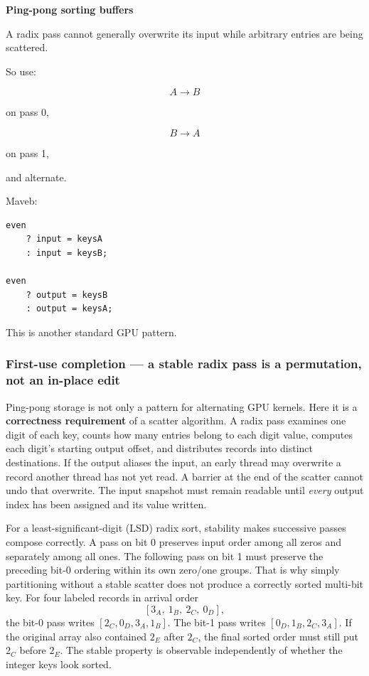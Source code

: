 \textbf{Ping-pong sorting buffers}

A radix pass cannot generally overwrite its input while arbitrary entries are being scattered.

So use:

\[
A\rightarrow B
\]

on pass 0,

\[
B\rightarrow A
\]

on pass 1,

and alternate.

Maveb:

\protect{}\label{w6g26n}%
\begin{verbatim}
even
    ? input = keysA
    : input = keysB;

even
    ? output = keysB
    : output = keysA;
\end{verbatim}

This is another standard GPU pattern.

\subsubsection{First-use completion --- a stable radix pass is a permutation, not an in-place edit}\label{03-visual-computing-i-ch016-first-use-completion-a-stable-radix-pass-is-a-permutation-not-an-in-place-edit}

\hypertarget{03-visual-computing-i-ch016-first-use-completion-a-stable-radix-pass-is-a-permutation-not-an-in-place-edit}{}

Ping-pong storage is not only a pattern for alternating GPU kernels. Here it is a \textbf{correctness requirement} of a scatter algorithm. A radix pass examines one digit of each key, counts how many entries belong to each digit value, computes each digit's starting output offset, and distributes records into distinct destinations. If the output aliases the input, an early thread may overwrite a record another thread has not yet read. A barrier at the end of the scatter cannot undo that overwrite. The input snapshot must remain readable until \emph{every} output index has been assigned and its value written.

For a least-significant-digit (LSD) radix sort, stability makes successive passes compose correctly. A pass on bit 0 preserves input order among all zeros and separately among all ones. The following pass on bit 1 must preserve the preceding bit-0 ordering within its own zero/one groups. That is why simply partitioning without a stable scatter does not produce a correctly sorted multi-bit key. For four labeled records in arrival order \[
[3_A,\ 1_B,\ 2_C,\ 0_D],
\] the bit-0 pass writes \([2_C,0_D,3_A,1_B]\). The bit-1 pass writes \([0_D,1_B,2_C,3_A]\). If the original array also contained \(2_E\) after \(2_C\), the final sorted order must still put \(2_C\) before \(2_E\). The stable property is observable independently of whether the integer keys look sorted.

